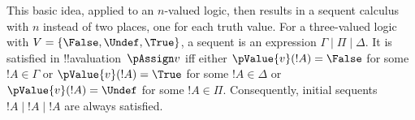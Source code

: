 \documentclass[../../../include/open-logic-section]{subfiles}
\begin{document}
This basic idea, applied to an $n$-valued logic, then results in a
sequent calculus with $n$ instead of two places, one for each truth
value. For a three-valued logic with $V = \{\False, \Undef, \True\}$,
a sequent is an expression $\Gamma \mid \Pi \mid \Delta$. It is
satisfied in !!a{valuation}~$\pAssign v$ iff either $\pValue{v}(!A) =
\False$ for some $!A \in \Gamma$ or $\pValue{v}(!A) = \True$ for some
$!A \in \Delta$ or $\pValue{v}(!A) = \Undef$ for some $!A \in \Pi$.
Consequently, initial sequents $!A \mid !A \mid !A$ are always
satisfied.
\end{document}
